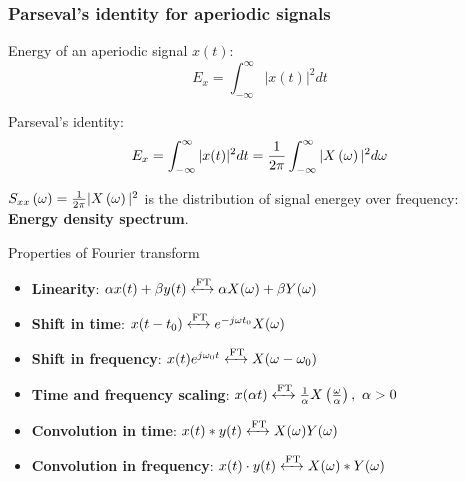 \documentclass[aspectratio=169]{beamer}
\let\olditem\item
\renewcommand{\item}{\setlength{\itemsep}{\fill}\olditem}
\def\lp{\ensuremath\left(}
\def\rp{\ensuremath\right)}
\begin{document}
\begin{frame}[t]
  \frametitle{Parseval's identity for aperiodic signals}

  Energy of an aperiodic signal $x(t)$:
  \[ E_x = \int_{-\infty}^{\infty} \vert x(t) \vert^2 dt \]

  Parseval's identity:
  \[ E_x = \int_{-\infty}^{\infty} \vert x(t) \vert^2 dt = \frac{1}{2\pi}\int_{-\infty}^{\infty} \vert X\lp \omega \rp\vert^2 d\omega \]
  
  $S_{xx}\lp \omega \rp = \frac{1}{2\pi}\vert X\lp \omega \rp\vert^2$ is the distribution of signal energey over frequency: \textbf{Energy density spectrum}.

\end{frame}


\begin{frame}{Properties of Fourier transform}

\begin{itemize}
\item \textbf{Linearity}: $\alpha x(t) + \beta y(t) \xleftrightarrow{\text{FT}} \alpha X(\omega) + \beta Y(\omega)$
\item \textbf{Shift in time}: $ x(t-t_0) \xleftrightarrow{\text{FT}} e^{-j\omega t_0}X(\omega)$
\item \textbf{Shift in frequency}: $ x(t)e^{j\omega_0 t} \xleftrightarrow{\text{FT}} X(\omega - \omega_0) $
\item \textbf{Time and frequency scaling}: $ x(\alpha t) \xleftrightarrow{\text{FT}} \frac{1}{\alpha} X\left(\frac{\omega}{\alpha}\right), \,\, \alpha > 0 $
\item \textbf{Convolution in time}: $x(t) * y(t) \xleftrightarrow{\text{FT}} X(\omega)Y(\omega) $
\item \textbf{Convolution in frequency}: $x(t) \cdot y(t) \xleftrightarrow{\text{FT}} X(\omega) * Y(\omega) $
\end{itemize}
\end{frame}
\end{document}
